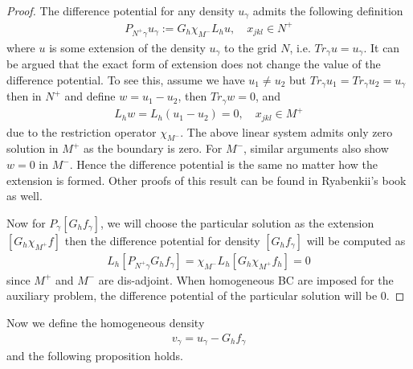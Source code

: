 \begin{proof}
The difference potential for any density $u_\gamma$ admits the following definition
\begin{align}
P_{N^+\gamma}u_\gamma:=G_h \chi_{M^-}L_hu,\quad x_{jkl}\in N^+
\end{align}
where $u$ is some extension of the density $u_\gamma$ to the grid $N$, i.e. $Tr_{\gamma}u = u_\gamma$. It can be argued that the exact form of extension does not change the value of the difference potential. To see this, assume we have $u_1\neq u_2$ but $Tr_\gamma u_1=Tr_{\gamma} u_2 = u_\gamma$ then in $N^+$ and define $w=u_1-u_2$, then $Tr_{\gamma}w=0$, and
\begin{align}
L_hw = L_h(u_1-u_2) = 0,\quad x_{jkl}\in M^+
\end{align}
due to the restriction operator $\chi_{M^-}$. The above linear system admits only zero solution in $M^+$ as the boundary is zero. For $M^-$, similar arguments also show $w=0$ in $M^-$.
Hence the difference potential is the same no matter how the extension is formed. Other proofs of this result can be found in Ryabenkii's book as well.

Now for $P_\gamma [G_hf_\gamma]$, we will choose the particular solution as the extension $[G_h\chi_{M^+}f]$ then the difference potential for density $[G_hf_\gamma]$ will be computed as
\begin{align}
L_h[P_{N^+\gamma}G_hf_\gamma] = \chi_{M^-}L_h[G_h\chi_{M^+}f_h]=0
\end{align}
since $M^+$ and $M^-$ are dis-adjoint. When homogeneous BC are imposed for the auxiliary problem, the difference potential of the particular solution will be 0.
\end{proof}

Now we define the homogeneous density
\begin{align}\label{eqn:vgamma}
v_\gamma = u_\gamma - G_hf_\gamma
\end{align} 
and the following proposition holds.

